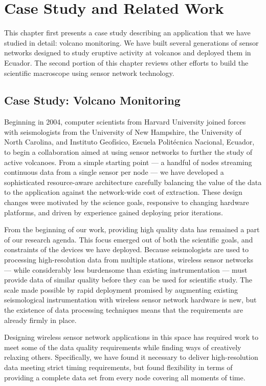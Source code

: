 \chapter{Case Study and Related Work}
\label{chapter-related}

This chapter first presents a case study describing an application that we
have studied in detail: volcano monitoring. We have built several generations
of sensor networks designed to study eruptive activity at volcanos and
deployed them in Ecuador. The second portion of this chapter reviews other
efforts to build the scientific macroscope using sensor network technology.

\section{Case Study: Volcano Monitoring}

Beginning in 2004, computer scientists from Harvard University joined forces
with seismologists from the University of New Hampshire, the University of
North Carolina, and Instituto Geof\'{i}sico, Escuela Polit\'{e}cnica
Nacional, Ecuador, to begin a collaboration aimed at using sensor networks to
further the study of active volcanoes. From a simple starting point --- a
handful of nodes streaming continuous data from a single sensor per node ---
we have developed a sophisticated resource-aware architecture carefully
balancing the value of the data to the application against the network-wide
cost of extraction. These design changes were motivated by the science goals,
responsive to changing hardware platforms, and driven by experience gained
deploying prior iterations. 

From the beginning of our work, providing high quality data has remained a
part of our research agenda. This focus emerged out of both the scientific
goals, and constraints of the devices we have deployed. Because seismologists
are used to processing high-resolution data from multiple stations, wireless
sensor networks --- while considerably less burdensome than existing
instrumentation --- must provide data of similar quality before they can be
used for scientific study. The scale made possible by rapid deployment
promised by augmenting existing seismological instrumentation with wireless
sensor network hardware is new, but the existence of data processing
techniques means that the requirements are already firmly in place.

Designing wireless sensor network applications in this space has required
work to meet some of the data quality requirements while finding ways of
creatively relaxing others. Specifically, we have found it necessary to
deliver high-resolution data meeting strict timing requirements, but found
flexibility in terms of providing a complete data set from every node
covering all moments of time.

